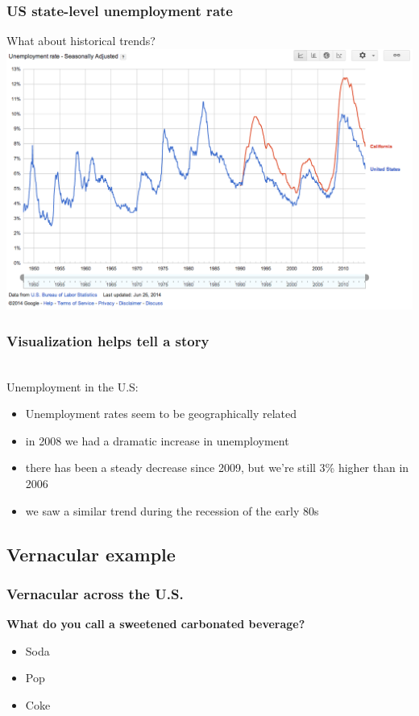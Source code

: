 \documentclass{beamer} %
\newcommand{\1}{\mathbb{1}}
\begin{document}
{				\begin{frame}[t]\frametitle{US state-level unemployment rate}
				What about historical trends?
				\includegraphics[scale = 0.29]{./visualization/unemployment_rate_historical.png}
				\end{frame}


				\begin{frame}[t]\frametitle{Visualization helps tell a story}
				\href{https://www.google.com/publicdata/explore?ds=z1ebjpgk2654c1_&met_y=unemployment_rate}{}\\
				Unemployment in the U.S:
				\begin{itemize}
					\item Unemployment rates seem to be geographically related
					\item in 2008 we had a dramatic increase in unemployment
					\item there has been a steady decrease since 2009, but we're still 3\% higher than in 2006
					\item we saw a similar trend during the recession of the early 80s
				\end{itemize}
				\end{frame}

}




\subsection[Visualizing data - vernacular]{Vernacular example}
\begin{frame}[t]\frametitle{Vernacular across the U.S.}
{\bf{What do you call a sweetened carbonated beverage?}}
\begin{itemize}
	\item Soda
	\item Pop
	\item Coke
\end{itemize}

\end{frame}
\end{document}
